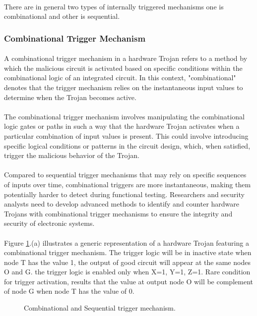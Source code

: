 \paragraph*{}
There are in general two types of internally triggered mechanisms one is combinational and other is sequential.
\subsubsection{Combinational Trigger Mechanism}
\paragraph*{}
A combinational trigger mechanism in a hardware Trojan refers to a method by which the malicious circuit is activated based on specific conditions within the combinational logic of an integrated circuit. In this context, "combinational" denotes that the trigger mechanism relies on the instantaneous input values to determine when the Trojan becomes active.
\paragraph*{}
The combinational trigger mechanism involves manipulating the combinational logic gates or paths in such a way that the hardware Trojan activates when a particular combination of input values is present. This could involve introducing specific logical conditions or patterns in the circuit design, which, when satisfied, trigger the malicious behavior of the Trojan.
\paragraph*{}
Compared to sequential trigger mechanisms that may rely on specific sequences of inputs over time, combinational triggers are more instantaneous, making them potentially harder to detect during functional testing. Researchers and security analysts need to develop advanced methods to identify and counter hardware Trojans with combinational trigger mechanisms to ensure the integrity and security of electronic systems.
\paragraph*{}
Figure \ref{fig:combAndSequ}.(a) illustrates a generic representation of a hardware Trojan featuring a combinational trigger mechanism. The trigger logic will be in inactive state when node T has the value 1, the output of good circuit will appear at the same nodes O and G. the trigger logic is enabled only when X=1, Y=1, Z=1. Rare condition for trigger activation, results that the value at output node O will be complement of node G when node T has the value of 0.
\begin{figure}[h]
	\centering
	\qquad
	\caption{Combinational and Sequential trigger mechanism.}%
	\label{fig:combAndSequ}%
\end{figure}
